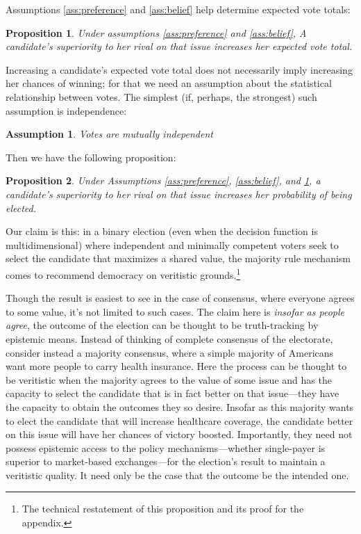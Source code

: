 \documentclass[11pt]{article}
\newtheorem{prop}{Proposition}
\newtheorem{ass}{Assumption}
\begin{document}
Assumptions \ref{ass:preference} and \ref{ass:belief} help determine expected vote totals:
\begin{prop}\label{prop:voteTotal}
Under assumptions \ref{ass:preference} and \ref{ass:belief}, 
A candidate's superiority to her rival on that issue increases her expected vote total.
\end{prop}
Increasing a candidate's expected vote total does not necessarily imply increasing her chances of winning; for that we need an assumption about the statistical relationship between votes.
The simplest (if, perhaps, the strongest) such assumption is independence:
\begin{ass}\label{ass:independent}
Votes are mutually independent
\end{ass}
Then we have the following proposition:
\begin{prop}
Under Assumptions \ref{ass:preference}, \ref{ass:belief}, and \ref{ass:independent}, 
a candidate's superiority to her rival on that issue increases her probability of being elected.
\end{prop}


Our claim is this: in a binary election (even when the decision function is multidimensional) where independent and minimally competent voters seek to select the candidate that maximizes a shared value, the majority rule mechanism comes to recommend democracy on veritistic grounds.\footnote{The technical restatement of this proposition and its proof for the appendix.}

Though the result is easiest to see in the case of consensus, where everyone agrees to some value, it's not limited to such cases. The claim here is \emph{insofar as people agree}, the outcome of the election can be thought to be truth-tracking by epistemic means.  Instead of thinking of complete consensus of the electorate, consider instead a majority consensus, where a simple majority of Americans want more people to carry health insurance. 
 Here the process can be thought to be veritistic when the majority agrees to the value of some issue and has the capacity to select the candidate that is in fact better on that issue---they have the capacity to obtain the outcomes they so desire. Insofar as this majority wants to elect the candidate that will increase healthcare coverage, the candidate better on this issue will have her chances of victory boosted. Importantly, they need not possess epistemic access to the policy mechanisms---whether single-payer is superior to market-based exchanges---for the election's result to maintain a veritistic quality. It need only be the case that the outcome be the intended one.
 
\end{document}
